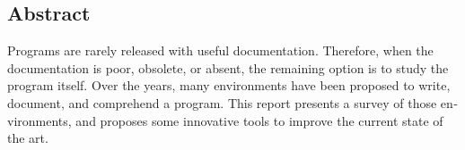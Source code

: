 
\begin{otherlanguage}{english}




\chapter*{Abstract}
\thispagestyle{empty}

Programs are rarely released with useful documentation. Therefore, when the documentation is poor, obsolete, or absent, the remaining option is to study the program itself. Over the years, many environments have been proposed to write, document, and comprehend a program. This report presents a survey of those environments, and proposes some innovative tools to improve the current state of the art.

\begin{flushleft}
\end{flushleft}

\end{otherlanguage}